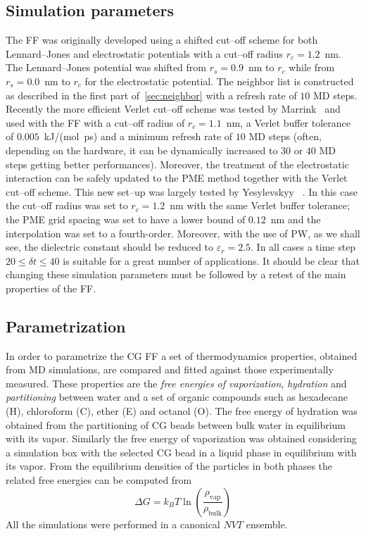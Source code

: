 \subsection{Simulation parameters}
The \martini \ac{FF} was originally developed using a shifted cut--off scheme for both Lennard--Jones and 
electrostatic potentials with a cut--off radius $r_c = 1.2$~nm. The Lennard--Jones potential was shifted from 
$r_s = 0.9$~nm to $r_c$ while from $r_s = 0.0$~nm to $r_c$ for the electrostatic potential. The neighbor list is 
constructed as described in the first part of~\ref{sec:neighbor} with a refresh rate of $10$ \ac{MD} steps. 
Recently the more efficient Verlet cut--off scheme was tested by Marrink \etal\, \cite{MartiniReview} and used 
with the \martini \ac{FF} with a cut--off radius of $r_c = 1.1$~nm, a Verlet buffer tolerance of $0.005$~kJ/(mol\ 
ps) and a minimum refresh rate of $10$ \ac{MD} steps (often, depending on the hardware, it can be dynamically 
increased to $30$ or $40$ \ac{MD} steps getting better performances).  Moreover, the treatment of the 
electrostatic interaction can be safely updated to the \ac{PME} method together with the Verlet cut--off scheme. 
This new set--up was largely tested by Yesylevskyy \etal\, \cite{PW}. In this case the cut--off radius was set to 
$r_c = 1.2$~nm with the same Verlet buffer tolerance; the \ac{PME} grid spacing was set to have a lower bound of 
$0.12$~nm and the interpolation was set to a fourth-order. Moreover, with the use of \ac{PW}, as we shall see, 
the dielectric constant should be reduced to $\varepsilon_r = 2.5$. In all cases a time step 
$20\le\delta t\le 40$ is suitable for a great number of applications. It should be clear that changing these 
simulation parameters must be followed by a retest of the main properties of the \martini \ac{FF}.

\subsection{Parametrization}
\label{sec:martiniParam}
In order to parametrize the \martini \ac{CG} \ac{FF} a set of thermodynamics properties, obtained from \ac{MD} 
simulations, are compared and fitted against those experimentally measured. These properties are the \textit{free 
energies of vaporization}, \textit{hydration} and \textit{partitioning} between water and a set of organic 
compounds such as hexadecane (H), chloroform (C), ether (E) and octanol (O). The free energy of hydration was 
obtained from the partitioning of \ac{CG} beads between bulk water in equilibrium with its vapor. Similarly the 
free energy of vaporization was obtained considering a simulation box with the selected \ac{CG} bead in a liquid 
phase in equilibrium with its vapor. From the equilibrium densities of the particles in both phases the related 
free energies can be computed from
\begin{equation*}
	\Delta G = k_B T\ln \left ( \frac{\rho_{\text{vap}}}{\rho_{\text{bulk}}} \right )
\end{equation*}
All the simulations were performed in a canonical $NVT$ ensemble.


